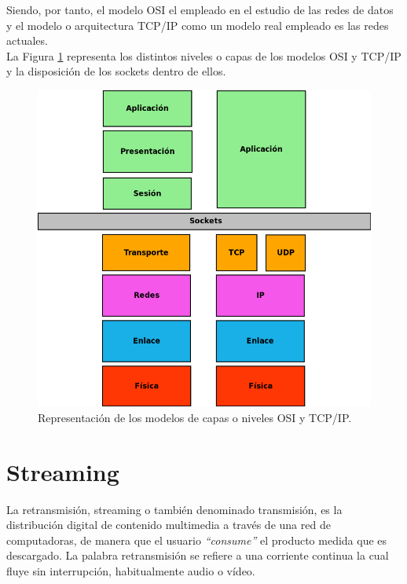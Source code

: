 Siendo, por tanto, el modelo OSI el empleado en el estudio de las redes de datos y el modelo o arquitectura TCP/IP como un modelo real
empleado es las redes actuales.\\

La Figura \ref{diagram:modelo-osi-tcp} representa los distintos niveles o capas de los modelos OSI y TCP/IP y la disposición de los sockets dentro de ellos.\\

\begin{figure}[H]
  \begin{center}
    \includegraphics[scale=0.4]{diagramas/modelo-capas.png}
  \end{center}
  \caption{ Representación de los modelos de capas o niveles OSI y TCP/IP.}
  \label{diagram:modelo-osi-tcp}
\end{figure}

\section{Streaming}
\label{sec:def-streaming}

La retransmisión, streaming o también denominado transmisión, es la distribución digital de contenido multimedia a través de una red de computadoras, 
de manera que el usuario \emph{``consume''} el producto medida que es descargado. La palabra retransmisión se refiere a una corriente continua la cual fluye sin interrupción,
habitualmente audio o vídeo.\\

